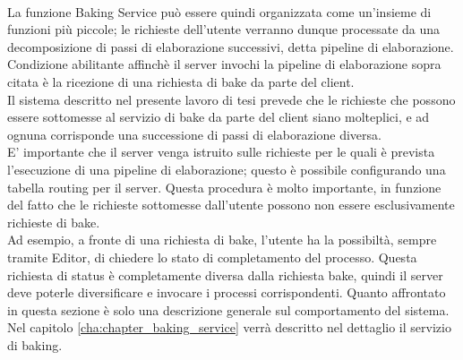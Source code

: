 \\
La funzione Baking Service può essere quindi organizzata come un’insieme di funzioni più piccole; 
le richieste dell’utente verranno dunque processate da una decomposizione di passi di elaborazione successivi, detta pipeline di elaborazione. 
\\
Condizione abilitante affinchè il server invochi la pipeline di elaborazione sopra citata è la ricezione di una richiesta di bake da parte del client.
\\ 
Il sistema descritto nel presente lavoro di tesi prevede che le richieste che possono essere sottomesse al servizio di bake da parte del client siano molteplici, e ad ognuna corrisponde una successione di passi di elaborazione diversa.
\\ 
E’ importante che il server venga istruito sulle richieste per le quali è prevista l’esecuzione di una pipeline di elaborazione; questo è possibile configurando una tabella routing per il server. Questa procedura è molto importante, in funzione del fatto che le richieste sottomesse dall’utente possono non essere esclusivamente richieste di bake. 
\\
Ad esempio, a fronte di una richiesta di bake, l’utente ha la possibiltà, sempre tramite Editor, di chiedere lo stato di completamento del processo. Questa richiesta di status è completamente diversa dalla richiesta bake, quindi il server deve poterle diversificare e invocare i processi corrispondenti. Quanto affrontato in questa sezione è solo una descrizione generale sul comportamento del sistema. Nel capitolo \ref{cha:chapter_baking_service} verrà descritto nel dettaglio il servizio di baking.